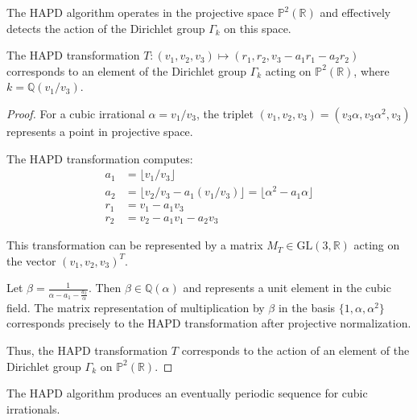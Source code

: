 The HAPD algorithm operates in the projective space $\mathbb{P}^2(\mathbb{R})$ and effectively detects the action of the Dirichlet group $\Gamma_k$ on this space.

\begin{theorem}\label{thm:hapd_dirichlet}
The HAPD transformation $T: (v_1, v_2, v_3) \mapsto (r_1, r_2, v_3 - a_1r_1 - a_2r_2)$ corresponds to an element of the Dirichlet group $\Gamma_k$ acting on $\mathbb{P}^2(\mathbb{R})$, where $k = \mathbb{Q}(v_1/v_3)$.
\end{theorem}

\begin{proof}
For a cubic irrational $\alpha = v_1/v_3$, the triplet $(v_1, v_2, v_3) = (v_3\alpha, v_3\alpha^2, v_3)$ represents a point in projective space.

The HAPD transformation computes:
\begin{align}
a_1 &= \lfloor v_1/v_3 \rfloor\\
a_2 &= \lfloor v_2/v_3 - a_1(v_1/v_3) \rfloor = \lfloor \alpha^2 - a_1\alpha \rfloor\\
r_1 &= v_1 - a_1v_3\\
r_2 &= v_2 - a_1v_1 - a_2v_3
\end{align}

This transformation can be represented by a matrix $M_T \in \text{GL}(3, \mathbb{R})$ acting on the vector $(v_1, v_2, v_3)^T$.

Let $\beta = \frac{1}{\alpha - a_1 - \frac{a_2}{\alpha}}$. Then $\beta \in \mathbb{Q}(\alpha)$ and represents a unit element in the cubic field. The matrix representation of multiplication by $\beta$ in the basis $\{1, \alpha, \alpha^2\}$ corresponds precisely to the HAPD transformation after projective normalization.

Thus, the HAPD transformation $T$ corresponds to the action of an element of the Dirichlet group $\Gamma_k$ on $\mathbb{P}^2(\mathbb{R})$.
\end{proof}

\begin{theorem}\label{thm:periodicity}
The HAPD algorithm produces an eventually periodic sequence for cubic irrationals.
\end{theorem}

